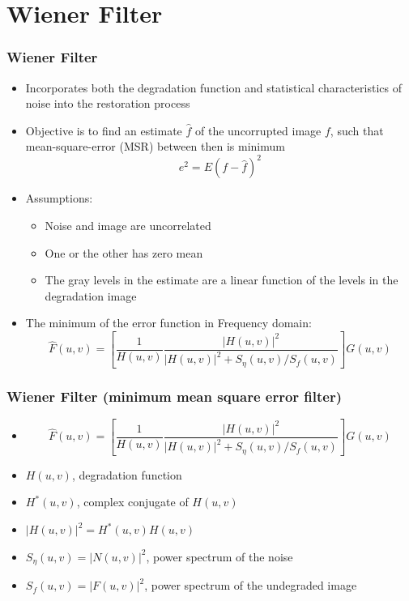 \documentclass{beamer}
\begin{document}
\section{Wiener Filter}
\begin{frame}
\frametitle{Wiener Filter}
\begin{itemize}
\item Incorporates both the degradation function and statistical characteristics of noise into the restoration process
\item Objective is to find an estimate $\hat{f}$ of the uncorrupted image $f$, such that mean-square-error (MSR) between then is minimum
$$e^{2} = E{(f - \hat{f})^{2}} $$
\item Assumptions:
\begin{itemize}
	\item Noise and image are uncorrelated
	\item One or the other has zero mean
	\item The gray levels in the estimate are a linear function of the levels in the degradation image
\end{itemize}
\item The minimum of the error function in Frequency domain:
$$\hat{F}(u,v) = [\frac{1}{H(u,v)}\frac{\vert H(u,v) \vert^{2}}{\vert H(u,v) \vert^{2} + S_{\eta}(u,v)/S_{f}(u,v)}]G(u,v)$$
 
\end{itemize}
\end{frame}
\begin{frame}
\frametitle{Wiener Filter \small{(minimum mean square error filter)}}
\begin{itemize}
\item[] $$\hat{F}(u,v) = [\frac{1}{H(u,v)}\frac{\vert H(u,v) \vert^{2}}{\vert H(u,v) \vert^{2} + S_{\eta}(u,v)/S_{f}(u,v)}]G(u,v)$$
\item $H(u,v)$, degradation function 
\item $H^{\ast}(u,v)$, complex conjugate of $H(u,v)$
\item $\vert H(u,v) \vert^{2} = H^{\ast}(u,v)H(u,v)$
\item $S_{\eta}(u,v) = \vert N(u,v) \vert^{2} $, power spectrum of the noise 
\item $S_{f}(u,v) = \vert F(u,v) \vert^{2} $, power spectrum of the undegraded image 
 
\end{itemize}
\end{frame}
\end{document}
